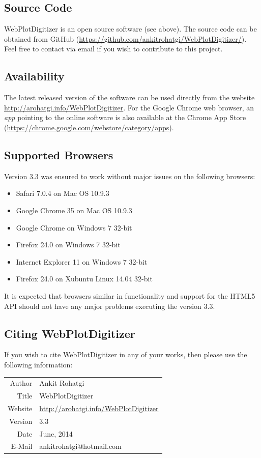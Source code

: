 \documentclass[letterpaper, 10pt]{article}
\begin{document}
\subsection{Source Code}
WebPlotDigitizer is an open source software (see above). The source code can be obtained from GitHub (\url{https://github.com/ankitrohatgi/WebPlotDigitizer/}). Feel free to contact via email if you wish to contribute to this project.

\subsection{Availability}
The latest released version of the software can be used directly from the website \url{http://arohatgi.info/WebPlotDigitizer}. For the Google Chrome web browser, an \emph{app} pointing to the online software is also available at the Chrome App Store (\url{https://chrome.google.com/webstore/category/apps}).

\subsection{Supported Browsers}
Version 3.3 was ensured to work without major issues on the following browsers:
\begin{itemize}
\item{Safari 7.0.4 on Mac OS 10.9.3}
\item{Google Chrome 35 on Mac OS 10.9.3}
\item{Google Chrome on Windows 7 32-bit}
\item{Firefox 24.0 on Windows 7 32-bit}
\item{Internet Explorer 11 on Windows 7 32-bit}
\item{Firefox 24.0 on Xubuntu Linux 14.04 32-bit}
\end{itemize}
It is expected that browsers similar in functionality and support for the HTML5 API should not have any major problems executing the version 3.3.

\subsection{Citing WebPlotDigitizer}
If you wish to cite WebPlotDigitizer in any of your works, then please use the following information:

\begin{center}
\begin{tabular}{|r|l|}
\hline
Author & Ankit Rohatgi\\
Title & WebPlotDigitizer\\
Website & \url{http://arohatgi.info/WebPlotDigitizer}\\
Version & 3.3\\
Date & June, 2014\\
E-Mail & ankitrohatgi@hotmail.com\\
\hline
\end{tabular}
\end{center}
\end{document}
